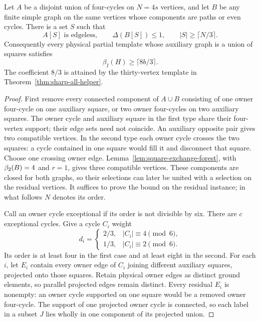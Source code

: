 \begin{theorem}\label{thm:all-owner-auxiliary-squares}
Let $A$ be a disjoint union of four-cycles on $N=4s$ vertices, and let $B$
be any finite simple graph on the same vertices whose components are paths
or even cycles. There is a set $S$ such that
\[
 A[S]\text{ is edgeless},\qquad \Delta(B[S])\le1,\qquad
 |S|\ge\lceil N/3\rceil.
\]
Consequently every physical partial template whose auxiliary graph is a
union of squares satisfies
\[
 \beta_I(H)\ge\lceil8b/3\rceil.
\]
The coefficient $8/3$ is attained by the thirty-vertex template in
Theorem~\ref{thm:sharp-all-helper}.
\end{theorem}
\begin{proof}
First remove every connected component of $A\cup B$ consisting of one owner
four-cycle on one auxiliary square, or two owner four-cycles on two auxiliary
squares. The owner cycle and auxiliary square in the first type share their four-vertex
support; their edge sets need not coincide. An auxiliary opposite pair gives two compatible
vertices. In the second type each owner cycle crosses the two squares:
a cycle contained in one square would fill it and disconnect that square.
Choose one crossing owner edge. Lemma~\ref{lem:square-exchange-forest}, with
$\beta_2(B)=4$ and $r=1$, gives three compatible vertices. These components
are closed for both graphs, so their selections can later be united with a
selection on the residual vertices. It suffices to prove the bound on the
residual instance; in what follows $N$ denotes its order.

Call an owner cycle exceptional if its order is not divisible by six.
There are $c$ exceptional cycles. Give a cycle $C_i$ weight
\[
 d_i=\begin{cases}2/3,&|C_i|\equiv4\pmod6,\\
                   1/3,&|C_i|\equiv2\pmod6.\end{cases}
\]
Its order is at least four in the first case and at least eight in the second.
For each $i$, let $E_i$ contain every owner edge of $C_i$ joining different
auxiliary squares, projected onto those squares. Retain physical owner edges
as distinct ground elements, so parallel projected edges remain distinct.
Every residual $E_i$ is nonempty: an owner cycle supported on one square
would be a removed owner four-cycle. The support of one projected owner
cycle is connected, so each label in a subset $J$ lies wholly in one
component of its projected union.


\end{proof}
